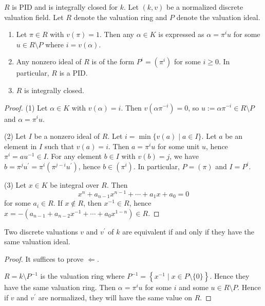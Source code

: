 \documentclass[11pt, a4paper]{report}
\begin{document}
\begin{theorem}
$R$ is PID and is integrally closed for $k$.
Let $(k, v)$ be a normalized discrete valuation field. Let $R$ denote the valuation ring and $P$ denote the valuation ideal.
\begin{enumerate}
\item Let $\pi \in R$ with $v(\pi)=1$. Then any $\alpha \in K$ is expressed as $\alpha=\pi^{i} u$ for some $u \in R \setminus P$ where $i=v(\alpha)$.
\item Any nonzero ideal of $R$ is of the form $P^{i}=\left(\pi^{i}\right)$ for some $i \geqslant 0$. In particular, $R$ is a PID.
\item $R$ is integrally closed.
\end{enumerate}
\end{theorem}
\begin{proof}
(1) Let $\alpha \in K$ with $v(\alpha)=i$. Then $v\left(\alpha \pi^{-i}\right)=0$, so $u:=\alpha \pi^{-i} \in R \setminus P$ and $\alpha=\pi^{i} u$.

(2) Let $I$ be a nonzero ideal of $R$. Let $i=\min \{v(a) \mid a \in I\}$. Let $a$ be an element in $I$ such that $v(a)=i$. Then $a=\pi^{i} u$ for some unit $u$, hence $\pi^{i}=a u^{-1} \in I$. For any element $b \in I$ with $v(b)=j$, we have $b=\pi^{j} u^{\prime}=\pi^{i}\left(\pi^{j-i} u^{\prime}\right)$, hence $b \in\left(\pi^{i}\right)$. In particular, $P=(\pi)$ and $I=P^{i}$.

(3) Let $x \in K$ be integral over $R$. Then
\[x^{n}+a_{n-1} x^{n-1}+\cdots+a_{1} x+a_{0}=0\]
for some $a_{i} \in R$. If $x \notin R$, then $x^{-1} \in R$, hence $x=-\left(a_{n-1}+a_{n-2} x^{-1}+\cdots+a_{0} x^{1-n}\right) \in R$.
\end{proof}

\begin{corollary}
Two discrete valuations $v$ and $v^{\prime}$ of $k$ are equivalent if and only if they have the same valuation ideal.
\end{corollary}

\begin{proof}
It suffices to prove $\Leftarrow$.

$R=k \setminus P^{-1}$ is the valuation ring where $P^{-1}=\left\{x^{-1} \mid x \in P \setminus\{0\}\right\}$. Hence they have the same valuation ring. Then $\alpha=\pi^{i} u$ for some $i$ and some $u \in R \setminus P$. Hence if $v$ and $v^{\prime}$ are normalized, they will have the same value on $R$.
\end{proof}
\end{document}
